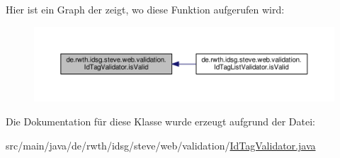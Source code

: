 Hier ist ein Graph der zeigt, wo diese Funktion aufgerufen wird\+:\nopagebreak
\begin{figure}[H]
\begin{center}
\leavevmode
\includegraphics[width=350pt]{classde_1_1rwth_1_1idsg_1_1steve_1_1web_1_1validation_1_1_id_tag_validator_af462861b25067836951b7e0651a1fce7_icgraph}
\end{center}
\end{figure}




Die Dokumentation für diese Klasse wurde erzeugt aufgrund der Datei\+:\begin{DoxyCompactItemize}
\item 
src/main/java/de/rwth/idsg/steve/web/validation/\hyperlink{_id_tag_validator_8java}{Id\+Tag\+Validator.\+java}\end{DoxyCompactItemize}
